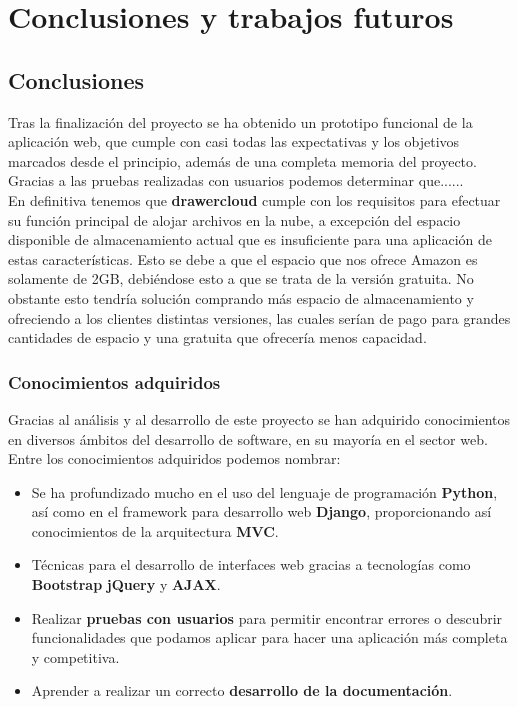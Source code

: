 \chapter{Conclusiones y trabajos futuros}

\section{Conclusiones}
Tras la finalización del proyecto se ha obtenido un prototipo funcional de la aplicación web, que cumple con casi todas las expectativas y los objetivos marcados desde el principio, además de una completa memoria del proyecto. \\
 
Gracias a las pruebas realizadas con usuarios podemos determinar que...... \\

En definitiva tenemos que \textbf{drawercloud} cumple con los requisitos para efectuar su función principal de alojar archivos en la nube, a excepción del espacio disponible de almacenamiento actual que es insuficiente para una aplicación de estas características. Esto se debe a que el espacio que nos ofrece Amazon es solamente de 2GB, debiéndose esto a que se trata de la versión gratuita. No obstante esto tendría solución comprando más espacio de almacenamiento y ofreciendo a los clientes distintas versiones, las cuales serían de pago para grandes cantidades de espacio y una gratuita que ofrecería menos capacidad. \\

\subsection{Conocimientos adquiridos}
Gracias al análisis y al desarrollo de este proyecto se han adquirido conocimientos en diversos ámbitos del desarrollo de software, en su mayoría en el sector web. Entre los conocimientos adquiridos podemos nombrar: 

\begin{itemize}
	\item Se ha profundizado mucho en el uso del lenguaje de programación \textbf{Python}, así como en el framework para desarrollo web \textbf{Django}, proporcionando así conocimientos de la arquitectura \textbf{MVC}.
	\item Técnicas para el desarrollo de interfaces web gracias a tecnologías como \textbf{Bootstrap} \textbf{jQuery} y \textbf{AJAX}.
	\item Realizar \textbf{pruebas con usuarios} para permitir encontrar errores o descubrir funcionalidades que podamos aplicar para hacer una aplicación más completa y competitiva.
	\item Aprender a realizar un correcto \textbf{desarrollo de la documentación}.
\end{itemize}

